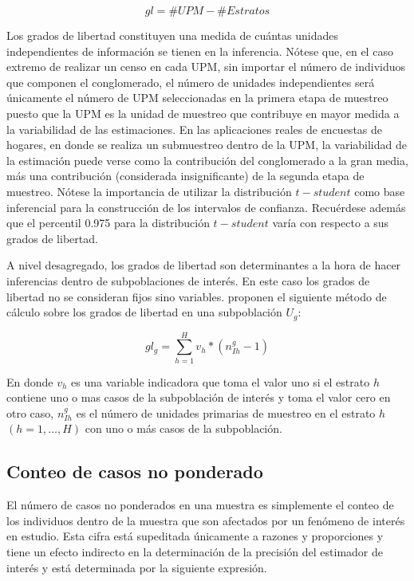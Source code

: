 \documentclass[
  12pt,
  spanish,
]{book}
\begin{document}
\[
gl = \# UPM - \# Estratos
\]

Los grados de libertad constituyen una medida de cuántas unidades independientes de información se tienen en la inferencia. Nótese que, en el caso extremo de realizar un censo en cada UPM, sin importar el número de individuos que componen el conglomerado, el número de unidades independientes será únicamente el número de UPM seleccionadas en la primera etapa de muestreo puesto que la UPM es la unidad de muestreo que contribuye en mayor medida a la variabilidad de las estimaciones. En las aplicaciones reales de encuestas de hogares, en donde se realiza un submuestreo dentro de la UPM, la variabilidad de la estimación puede verse como la contribución del conglomerado a la gran media, más una contribución (considerada insignificante) de la segunda etapa de muestreo. Nótese la importancia de utilizar la distribución \(t-student\) como base inferencial para la construcción de los intervalos de confianza. Recuérdese además que el percentil 0.975 para la distribución \(t-student\) varía con respecto a sus grados de libertad.

A nivel desagregado, los grados de libertad son determinantes a la hora de hacer inferencias dentro de subpoblaciones de interés. En este caso los grados de libertad no se consideran fijos sino variables. \citet[p.~209]{Korn_Graubard_1999} proponen el siguiente método de cálculo sobre los grados de libertad en una subpoblación \(U_g\):

\[
gl_{g} = \sum_{h=1}^H v_h*(n_{Ih}^g - 1)
\]

En donde \(v_h\) es una variable indicadora que toma el valor uno si el estrato \(h\) contiene uno o mas casos de la subpoblación de interés y toma el valor cero en otro caso, \(n_{Ih}^g\) es el número de unidades primarias de muestreo en el estrato \(h\) \((h=1, \ldots, H)\) con uno o más casos de la subpoblación.

\hypertarget{conteo-de-casos-no-ponderado}{%
\subsection{Conteo de casos no ponderado}\label{conteo-de-casos-no-ponderado}}

El número de casos no ponderados en una muestra es simplemente el conteo de los individuos dentro de la muestra que son afectados por un fenómeno de interés en estudio. Esta cifra está supeditada únicamente a razones y proporciones y tiene un efecto indirecto en la determinación de la precisión del estimador de interés y está determinada por la siguiente expresión.
\end{document}
